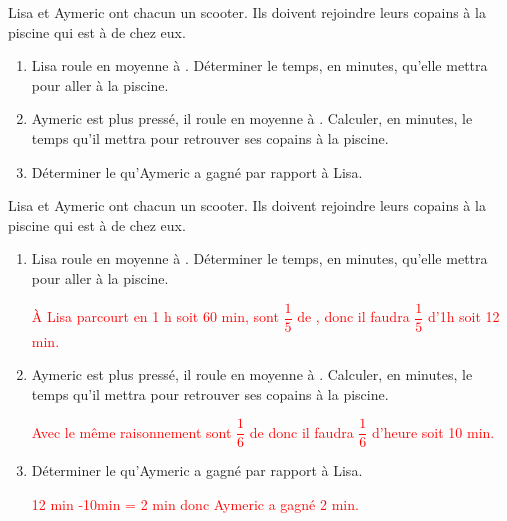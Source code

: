 \begin{exercice*}
    Lisa et Aymeric ont chacun un scooter. Ils doivent rejoindre leurs copains à la piscine qui est à  de chez eux.
    \begin{enumerate}
        \item Lisa roule en moyenne à . Déterminer le temps, en minutes, qu'elle mettra pour aller à la piscine.
        \item Aymeric est plus pressé, il roule en moyenne à . Calculer, en minutes, le temps qu’il mettra pour retrouver ses copains à la piscine.
        \item Déterminer le qu'Aymeric a gagné par rapport à Lisa.
    \end{enumerate}
\end{exercice*}
\begin{corrige}
    Lisa et Aymeric ont chacun un scooter. Ils doivent rejoindre leurs copains à la piscine qui est à  de chez eux.
    \begin{enumerate}
        \item Lisa roule en moyenne à . Déterminer le temps, en minutes, qu'elle mettra pour aller à la piscine.
        \par\textcolor{red}{À  Lisa parcourt  en 1 h soit 60 min,  sont $\dfrac{1}{5}$ de , donc il faudra $\dfrac{1}{5}$ d'1h soit 12 min.}
        \item Aymeric est plus pressé, il roule en moyenne à . Calculer, en minutes, le temps qu’il mettra pour retrouver ses copains à la piscine.
        \par\textcolor{red}{Avec le même raisonnement  sont $\dfrac{1}{6}$ de  donc il faudra $\dfrac{1}{6}$ d'heure soit 10 min.}
        \item Déterminer le qu'Aymeric a gagné par rapport à Lisa.
        \par\textcolor{red}{12 min -10min = 2 min donc Aymeric a gagné 2 min.}
    \end{enumerate}
\end{corrige}

